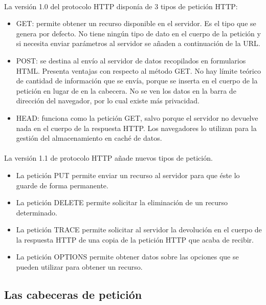\documentclass{article}
\begin{document}
	\paragraph{}La versión 1.0 del protocolo HTTP disponía de 3 tipos de petición HTTP:
	
	 \begin{itemize}
	 	\item GET: permite obtener un recurso disponible en el servidor. Es el tipo que se genera por defecto. No tiene ningún tipo de dato en el cuerpo de la petición y si necesita enviar parámetros al servidor se añaden a continuación de la URL.
	 	\item POST: se destina al envío al servidor de datos recopilados en formularios HTML. Presenta ventajas con respecto al método GET.
	 		\subitem No hay límite teórico de cantidad de información que se envía, porque se inserta en el cuerpo de la petición en lugar de en la cabecera.
	 		\subitem No se ven los datos en la barra de dirección del navegador, por lo cual existe más privacidad.
	 	\item HEAD: funciona como la petición GET, salvo porque el servidor no devuelve nada en el cuerpo de la respuesta HTTP. Los navegadores lo utilizan para la gestión del almacenamiento en caché de datos.
	 \end{itemize}
	
	\paragraph{}La versión 1.1 de protocolo HTTP añade nuevos tipos de petición.
	
	\begin{itemize}
		\item La petición PUT permite enviar un recurso al servidor para que éste lo guarde de forma permanente.
		\item La petición DELETE permite solicitar la eliminación de un recurso determinado.
		\item La petición TRACE permite solicitar al servidor la devolución en el cuerpo de la respuesta HTTP de una copia de la petición HTTP que acaba de recibir.
		\item La petición OPTIONS permite obtener datos sobre las opciones que se pueden utilizar para obtener un recurso.
	\end{itemize}
	
	\subsection{Las cabeceras de petición}
	
\end{document}
